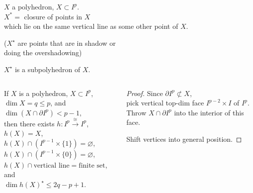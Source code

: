 \documentclass[14pt]{beamer}
\newcommand{\clearbackgroundpicture}{\usebackgroundtemplate{}}
\begin{document}
\begin{frame}
  \begin{definition}
    $X$ a polyhedron, $X \subset I^p$. \\
    $X^\ast =$ closure of points in $X$ \\
    which lie on the same vertical line as some other point of $X$.
  \end{definition}
  \vfill\pause
  ($X^\star$ are points that are in shadow or \\
  \quad doing the overshadowing)
  \vfill\pause
  \begin{lemma}
    $X^\star$ is a subpolyhedron of $X$.
  \end{lemma}
\end{frame}

\begin{frame}
  \begin{columns}
    \begin{column}{0.5\textwidth}
  \begin{lemma}
    If $X$ is a polyhedron, $X \subset I^p$, \\
    $\dim X = q \leq p$, and \\
    $\dim (X \cap \partial I^p) < p - 1$, \\
    then there exists
    $h : I^p \stackrel{\cong}{\longrightarrow} I^p$, \\
    $h(X) = X$, \\
    $h(X) \cap \left( I^{p-1} \times \{1\} \right) = \varnothing $, \\
    $h(X) \cap \left( I^{p-1} \times \{0\} \right) = \varnothing $, \\
    $h(X) \cap \mbox{vertical line} = \mbox{finite set}$, and \\
    $\dim h(X)^\star \leq 2q - p + 1$.
  \end{lemma}
  \end{column}
  \begin{column}{0.5\textwidth}
    \pause
    \begin{proof}
      Since $\partial I^p \not\subset X$, \\
      pick vertical
      top-dim face $I^{p-2} \times I$ of $I^p$. \\
      Throw $X
      \cap \partial I^p$ into the interior of this face.

\pause
      \vspace{1ex} Shift vertices into general position.\pause
    \end{proof}
  \end{column}
  \end{columns}
\end{frame}
\clearbackgroundpicture
\end{document}
